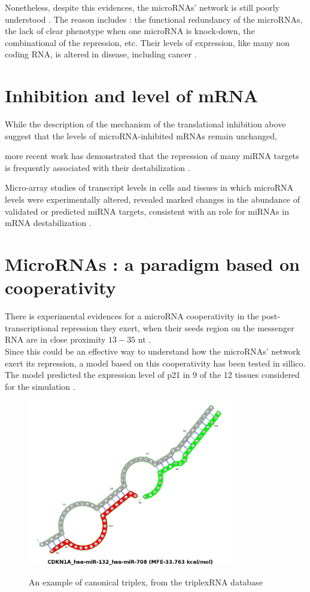 \documentclass[a4paper,12pt]{report}
\begin{document}
Nonetheless, despite this evidences, the microRNAs' network is still poorly understood \cite{network,cancer}. The reason includes : the functional redundancy of the microRNAs, the lack of clear phenotype when one microRNA is knock-down, the combinational of the repression, etc\cite{network,cancer}. 
Their levels of expression, like many non coding RNA, is altered in disease, including cancer \cite{cancer}.

\section{Inhibition and level of mRNA}

While the description of the mechanism of the translational inhibition above suggest that the levels of microRNA-inhibited mRNAs remain unchanged,

more recent work has demonstrated that the repression of many miRNA targets is frequently associated with their destabilization \cite{cancer}.

Micro-array studies of transcript levels in cells and tissues
in which microRNA levels were experimentally altered, revealed marked changes in the abundance of validated or predicted miRNA targets, consistent with an role for miRNAs in mRNA destabilization \cite{cancer}.

\section{MicroRNAs : a paradigm based on cooperativity}

There is experimental evidences for a microRNA cooperativity in the post-transcriptional repression they exert, when their seeds region on the messenger RNA are in close proximity $13\!- \!35$ nt \cite{site, coop}.\\
 Since this could be an effective way to understand how the microRNAs' network exert its repression, a model based on this cooperativity has been tested in sillico. The model predicted the expression level of p21 in 9 of the 12 tissues considered for the simulation \cite{p21}.
\begin{figure}[H]
	\centering
	{\includegraphics[width=0.8\textwidth]{canonical.png}}
	\caption{An example of canonical triplex, from the triplexRNA database}
\end{figure}
\end{document}
